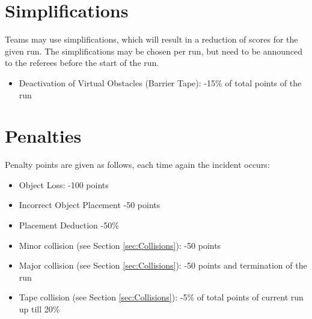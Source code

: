 \section{Simplifications}
Teams may use simplifications, which will result in a reduction of scores for the given run. The simplifications may be chosen per run, but need to be announced to the referees before the start of the run.

\begin{itemize}
  \item Deactivation of Virtual Obstacles (Barrier Tape): -15\% of total points of the run
\end{itemize}


\section{Penalties}
\label{sec:penalties}
Penalty points are given as follows, each time again the incident occurs:

\begin{itemize}
	\item Object Loss: \hfill -100 points
	\item Incorrect Object Placement \hfill -50 points
	\item Placement Deduction \hfill -50\%
	\item Minor collision (see Section \ref{sec:Collisions}): \hfill -50 points
	\item Major collision (see Section \ref{sec:Collisions}): \hfill -50 points and termination of the run
  \item Tape collision (see Section \ref{sec:Collisions}): \hfill -5\% of total points of current run up till
  20\%
\end{itemize}

